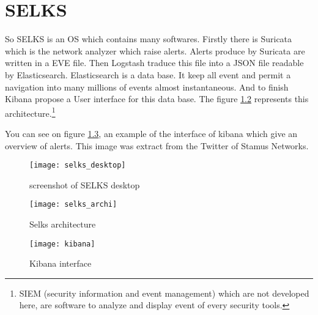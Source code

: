 
\chapter{SELKS}
\label{chap:selks}


So SELKS is an OS which contains many softwares. Firstly there is Suricata which is the network analyzer which raise
alerts. Alerts produce by Suricata are written in a EVE file. Then Logstash traduce this file into a JSON file
readable by Elasticsearch. Elasticsearch is a data base. It keep all event and permit a navigation into many
millions of events almost instantaneous. And to finish Kibana propose a User interface for this data base. The
figure \ref{fig:selks_archi} represents this architecture.\footnote{SIEM (security information and event management)
  which are not developed here, are software to analyze and display event of every security tools.}%


You can see on figure \ref{fig:kibana}, an example of the interface of kibana which give an overview of alerts.
This image was extract from the Twitter of Stamus Networks.


\begin{figure}[h]
  \centering
  \texttt{[image: selks\_desktop]}
  \caption{screenshot of SELKS desktop}
  \label{fig:selks}
\end{figure}

\begin{figure}[h]
  \centering
  \texttt{[image: selks\_archi]}
  \caption{Selks architecture}
  \label{fig:selks_archi}
\end{figure}



\begin{figure}[h]
  \centering
  \texttt{[image: kibana]}
  \caption{Kibana interface}
  \label{fig:kibana}
\end{figure}


